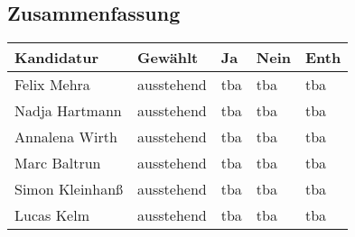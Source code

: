 \subsection{Zusammenfassung}
\begin{center}
    \begin{tabular}{|p{6cm}|m{2cm}|m{1cm}|m{1cm}|m{1cm}|}
        \hline
        Kandidatur & Gewählt & Ja & Nein & Enth\\\hline
        Felix Mehra & ausstehend & tba & tba & tba \\\hline
		Nadja Hartmann & ausstehend & tba & tba & tba \\\hline
		Annalena Wirth & ausstehend & tba & tba & tba \\\hline
		Marc Baltrun & ausstehend & tba & tba & tba \\\hline
		Simon Kleinhanß & ausstehend & tba & tba & tba \\\hline
		Lucas Kelm & ausstehend & tba & tba & tba \\\hline

    \end{tabular}
\end{center}